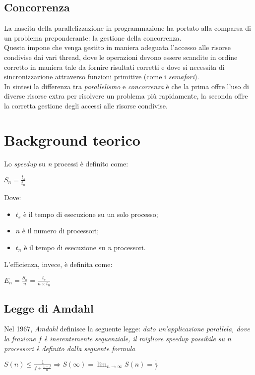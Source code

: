 \subsection{Concorrenza}
La nascita della parallelizzazione in programmazione ha portato alla comparsa di un problema preponderante: la gestione della concorrenza. \\
Questa impone che venga gestito in maniera adeguata l'accesso alle risorse condivise dai vari thread, dove le operazioni devono essere scandite in ordine corretto in maniera tale da fornire risultati corretti e dove si necessita di sincronizzazione attraverso funzioni primitive (come i \textit{semafori}). \\
In sintesi la differenza tra \textit{parallelismo} e \textit{concorrenza} è che la prima offre l'uso di diverse risorse extra per risolvere un problema più rapidamente, la seconda offre la corretta gestione degli accessi alle risorse condivise.

\section{Background teorico}
Lo \textit{speedup} su \textit{n} processi è definito come:
\begin{center}
	$S_{n} = \frac{t_{s}}{t_{n}}$
\end{center}
Dove:
\begin{itemize}
	\item $t_s$ è il tempo di esecuzione su un solo processo;
	\item $n$ è il numero di processori;
	\item $t_n$ è il tempo di esecuzione su \textit{n} processori.
\end{itemize}
L'efficienza, invece, è definita come:
\begin{center}
	$E_{n} = \frac{S_{n}}{n} = \frac{t_{s}}{n\times t_{n}}$ \\
\end{center}

\subsection{Legge di Amdahl}
Nel 1967, \textit{Amdahl} definisce la seguente legge: \textit{dato un'applicazione parallela, dove la frazione $f$ è inerentemente sequenziale, il migliore speedup possibile su $n$ processori è definito dalla seguente formula}
\begin{center}
	$S(n) \leq \frac{1}{f + \frac{1 - f}{n}} \Rightarrow S(\infty) = \lim_{n\rightarrow \infty} S(n) = \frac{1}{f} $
\end{center}

